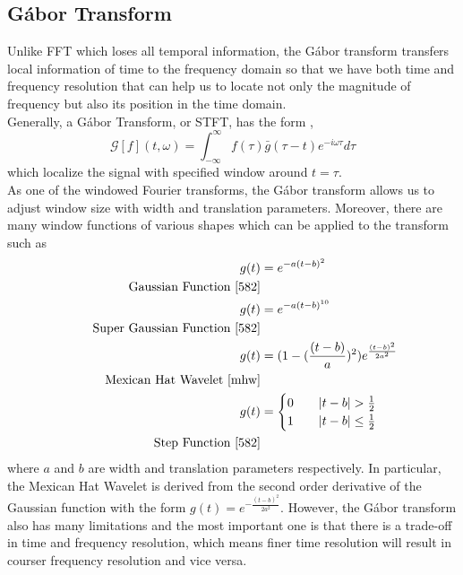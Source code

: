 \documentclass[10pt,a4paper]{article}
\numberwithin{equation}{subsection}
\newcommand{\eqname}[1]{\tag*{#1}}
\begin{document}
\subsection{G\'abor Transform}
Unlike FFT which loses all temporal information, the G\'abor transform transfers local information of time to the frequency domain so that we have both time and frequency resolution that can help us to locate not only the magnitude of frequency but also its position in the time domain.\\
Generally, a G\'abor Transform, or STFT, has the form \cite{582},
\begin{equation}
\mathcal{G}[f](t,\omega) = \int_{-\infty}^{\infty}f(\tau)\bar{g}(\tau - t)e^{-i\omega\tau}d\tau
\end{equation}
which localize the signal with specified window around $t=\tau$.\\
As one of the windowed Fourier transforms, the G\'abor transform allows us to adjust window size with width and translation parameters. Moreover, there are many window functions of various shapes which can be applied to the transform such as
\begin{align}
g(t) &= e^{-a(t-b)^2} \\ \eqname{Gaussian Function \cite{582}}\\
g(t) &= e^{-a(t-b)^{10}} \\ \eqname{Super Gaussian Function \cite{582}}\\
g(t) &= (1-(\frac{(t-b)}{a})^2)e^{\frac{(t-b)^2}{2a^2}} \\ \eqname{Mexican Hat Wavelet \cite{mhw}}\\
g(t) &= \begin{cases}
0\qquad |t-b| > \frac{1}{2}\\
1\qquad |t-b|\leq\frac{1}{2}
\end{cases}\\ \eqname{Step Function \cite{582}}
\end{align}
where $a$ and $b$ are width and translation parameters respectively. In particular, the Mexican Hat Wavelet is derived from the second order derivative of the Gaussian function with the form $g(t) = e^{-\frac{(t-b)^2}{2a^2}}$. However, the G\'abor transform also has many limitations and the most important one is that there is a trade-off in time and frequency resolution, which means finer time resolution will result in courser frequency resolution and vice versa.
\end{document}
